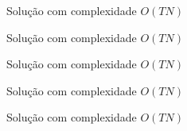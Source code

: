 \begin{frame}[fragile]{Solução com complexidade $O(TN)$}
\end{frame}

\begin{frame}[fragile]{Solução com complexidade $O(TN)$}
\end{frame}

\begin{frame}[fragile]{Solução com complexidade $O(TN)$}
\end{frame}

\begin{frame}[fragile]{Solução com complexidade $O(TN)$}
\end{frame}

\begin{frame}[fragile]{Solução com complexidade $O(TN)$}
\end{frame}
